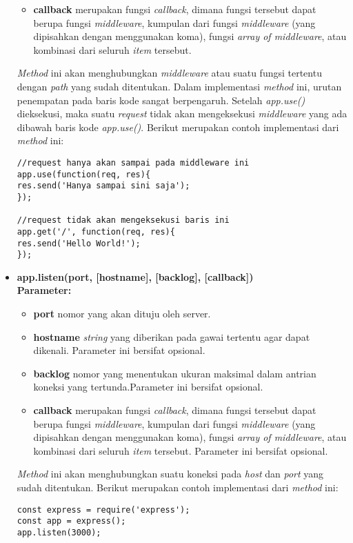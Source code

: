 \begin{itemize}
\begin{itemize}
		\item \textbf{callback} merupakan fungsi \textit{callback}, dimana fungsi tersebut dapat berupa fungsi \textit{middleware}, kumpulan dari fungsi \textit{middleware} (yang dipisahkan dengan menggunakan koma), fungsi \textit{array of middleware}, atau kombinasi dari seluruh \textit{item} tersebut.
	\end{itemize}
	
	\textit{Method} ini akan menghubungkan \textit{middleware} atau suatu fungsi tertentu dengan \textit{path} yang sudah ditentukan. Dalam implementasi \textit{method} ini, urutan penempatan pada baris kode sangat berpengaruh. Setelah \textit{app.use()} dieksekusi, maka suatu \textit{request} tidak akan mengeksekusi \textit{middleware} yang ada dibawah baris kode \textit{app.use()}.  Berikut merupakan contoh implementasi dari \textit{method} ini:
\begin{lstlisting}
//request hanya akan sampai pada middleware ini
app.use(function(req, res){
res.send('Hanya sampai sini saja');
});
	
//request tidak akan mengeksekusi baris ini
app.get('/', function(req, res){
res.send('Hello World!');
});
\end{lstlisting}
	
	\item \textbf{app.listen(port, [hostname], [backlog], [callback])} \\ \textbf{Parameter:}
	\begin{itemize}
		\item \textbf{port} nomor yang akan dituju oleh server.
		\item \textbf{hostname} \textit{string} yang diberikan pada gawai tertentu agar dapat dikenali. Parameter ini bersifat opsional.
		\item \textbf{backlog} nomor yang menentukan ukuran maksimal dalam antrian koneksi yang tertunda.Parameter ini bersifat opsional.
		\item \textbf{callback} merupakan fungsi \textit{callback}, dimana fungsi tersebut dapat berupa fungsi \textit{middleware}, kumpulan dari fungsi \textit{middleware} (yang dipisahkan dengan menggunakan koma), fungsi \textit{array of middleware}, atau kombinasi dari seluruh \textit{item} tersebut. Parameter ini bersifat opsional.
	\end{itemize}
	
	\textit{Method} ini akan menghubungkan suatu koneksi pada \textit{host} dan \textit{port} yang sudah ditentukan. Berikut merupakan contoh implementasi dari \textit{method} ini:
\begin{lstlisting}
const express = require('express');
const app = express();
app.listen(3000);
\end{lstlisting}
	
\end{itemize}

